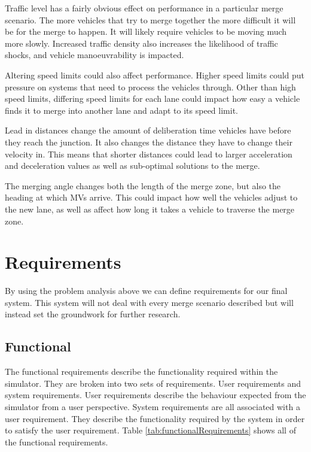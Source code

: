 Traffic level has a fairly obvious effect on performance in a particular merge scenario. The more vehicles that try to merge together the more difficult it will be for the merge to happen. It will likely require vehicles to be moving much more slowly. Increased traffic density also increases the likelihood of traffic shocks, and vehicle manoeuvrability is impacted.

Altering speed limits could also affect performance. Higher speed limits could put pressure on systems that need to process the vehicles through. Other than high speed limits, differing speed limits for each lane could impact how easy a vehicle finds it to merge into another lane and adapt to its speed limit.

Lead in distances change the amount of deliberation time vehicles have before they reach the junction. It also changes the distance they have to change their velocity in. This means that shorter distances could lead to larger acceleration and deceleration values as well as sub-optimal solutions to the merge. 

The merging angle changes both the length of the merge zone, but also the heading at which MVs arrive. This could impact how well the vehicles adjust to the new lane, as well as affect how long it takes a vehicle to traverse the merge zone.

\section{Requirements}
\label{sec:Requirements}
By using the problem analysis above we can define requirements for our final system. This system will not deal with every merge scenario described but will instead set the groundwork for further research.

\subsection{Functional}
\label{subsec:Functional}
The functional requirements describe the functionality required within the simulator. They are broken into two sets of requirements. User requirements and system requirements. User requirements describe the behaviour expected from the simulator from a user perspective. System requirements are all associated with a user requirement. They describe the functionality required by the system in order to satisfy the user requirement. Table \ref{tab:functionalRequirements} shows all of the functional requirements.


